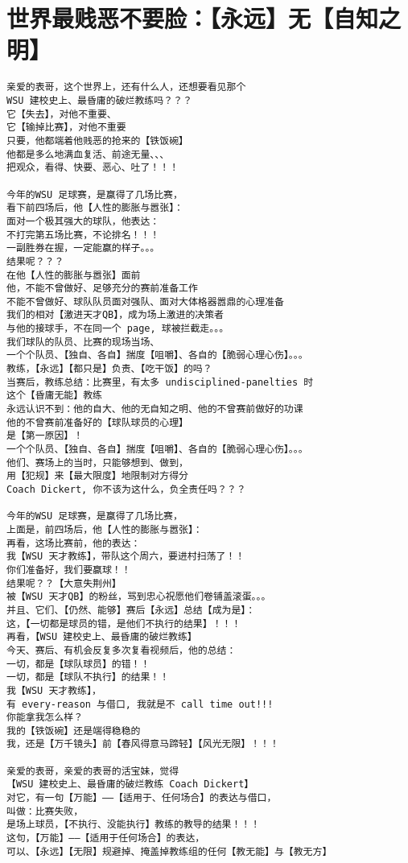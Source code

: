 \documentclass[9pt, b5paper]{article}
\begin{document}
\section{世界最贱恶不要脸：【永远】无【自知之明】}
\label{sec-12}
\begin{verbatim}
亲爱的表哥，这个世界上，还有什么人，还想要看见那个
WSU 建校史上、最昏庸的破烂教练吗？？？
它【失去】，对他不重要、
它【输掉比赛】，对他不重要
只要，他都端着他贱恶的抢来的【铁饭碗】
他都是多么地满血复活、前途无量、、、
把观众，看得、快要、恶心、吐了！！！

今年的WSU 足球赛，是赢得了几场比赛，
看下前四场后，他【人性的膨胀与嚣张】：
面对一个极其强大的球队，他表达：
不打完第五场比赛，不论排名！！！
一副胜券在握，一定能赢的样子。。。
结果呢？？？
在他【人性的膨胀与嚣张】面前
他，不能不曾做好、足够充分的赛前准备工作
不能不曾做好、球队队员面对强队、面对大体格器嚣鼎的心理准备
我们的相对【激进天才QB】，成为场上激进的决策者
与他的接球手，不在同一个 page, 球被拦截走。。。
我们球队的队员、比赛的现场当场、
一个个队员、【独自、各自】揣度【咀嚼】、各自的【脆弱心理心伤】。。。
教练，【永远】【都只是】负责、【吃干饭】的吗？
当赛后，教练总结：比赛里，有太多 undisciplined-panelties 时
这个【昏庸无能】教练
永远认识不到：他的自大、他的无自知之明、他的不曾赛前做好的功课
他的不曾赛前准备好的【球队球员的心理】
是【第一原因】！
一个个队员、【独自、各自】揣度【咀嚼】、各自的【脆弱心理心伤】。。。
他们、赛场上的当时，只能够想到、做到，
用【犯规】来【最大限度】地限制对方得分
Coach Dickert, 你不该为这什么，负全责任吗？？？

今年的WSU 足球赛，是赢得了几场比赛，
上面是，前四场后，他【人性的膨胀与嚣张】：
再看，这场比赛前，他的表达：
我【WSU 天才教练】，带队这个周六，要进村扫荡了！！
你们准备好，我们要赢球！！
结果呢？？【大意失荆州】
被【WSU 天才QB】的粉丝，骂到忠心祝愿他们卷铺盖滚蛋。。。
并且、它们、【仍然、能够】赛后【永远】总结【成为是】：
这，【一切都是球员的错，是他们不执行的结果】！！！
再看，【WSU 建校史上、最昏庸的破烂教练】
今天、赛后、有机会反复多次复看视频后，他的总结：
一切，都是【球队球员】的错！！
一切，都是【球队不执行】的结果！！
我【WSU 天才教练】，
有 every-reason 与借口, 我就是不 call time out!!!
你能拿我怎么样？
我的【铁饭碗】还是端得稳稳的
我，还是【万千镜头】前【春风得意马蹄轻】【风光无限】！！！

亲爱的表哥，亲爱的表哥的活宝妹，觉得
【WSU 建校史上、最昏庸的破烂教练 Coach Dickert】
对它，有一句【万能】——【适用于、任何场合】的表达与借口，
叫做：比赛失败，
是场上球员，【不执行、没能执行】教练的教导的结果！！！
这句，【万能】——【适用于任何场合】的表达，
可以、【永远】【无限】规避掉、掩盖掉教练组的任何【教无能】与【教无方】


\end{verbatim}
\end{document}
